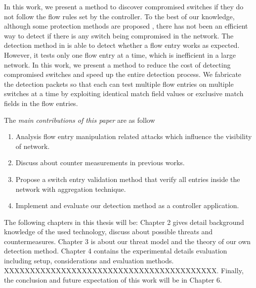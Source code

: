 In this work, we present a method to discover compromised switches if they do not follow the flow rules set by the controller. To the best of our knowledge, although some protection methods are proposed \cite{CKGL15}, there has not been an efficient way to detect if there is any switch being compromised in the network. The detection method in \cite{CKGL15} is able to detect whether a flow entry works as expected. However, it tests only one flow entry at a time, which is inefficient in a large network. In this work, we present a method to reduce the cost of detecting compromised switches and speed up the entire detection process. We fabricate the detection packets so that each can test multiple flow entries on multiple switches at a time by exploiting identical match field values or exclusive match fields in the flow entries. 

The \emph{main contributions of this paper} are as follow 
\begin{enumerate}
\item
Analysis flow entry manipulation related attacks which influence the visibility of network.
\item
Discuss about counter measurements in previous works.
\item
Propose a switch entry validation method that verify all entries inside the network with aggregation technique.
\item
Implement and evaluate our detection method as a controller application.
\end{enumerate}

The following chapters in this thesis will be: Chapter 2 gives detail background knowledge of the used technology, discuss about possible threats and countermeasures. Chapter 3 is about our threat model and the theory of our own detection method. Chapter 4 contains the experimental details evaluation including setup, considerations and evaluation methods. XXXXXXXXXXXXXXXXXXXXXXXXXXXXXXXXXXXXXXXXX.
Finally, the conclusion and future expectation of this work will be in Chapter 6.